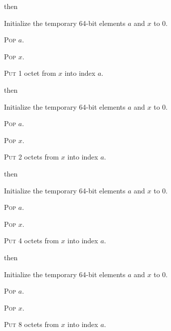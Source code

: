 \documentclass[a4paper,12pt]{article}
\newcommand{\num}[1]{\texttt{#1}}
\newcommand{\hex}[1]{\num{#1}_{\textup{\tiny 16}}}
\newcommand{\proc}[1]{\textsc{#1}}
\newcommand{\op}[1]{$#1$}
\theoremstyle{definition}
\newcommand{\STOREB}    [1]{\op{\hex{14}}}
\newcommand{\STORES}    [1]{\op{\hex{15}}}
\newcommand{\STOREI}    [1]{\op{\hex{16}}}
\newcommand{\STOREL}    [1]{\op{\hex{17}}}
\begin{document}
\begin{stepnumbers}[start=3]
\begin{description}
\begin{stepnumbers}
    \end{stepnumbers}
  \item[\STOREB{}] then
    \begin{stepnumbers}
    \item Initialize the temporary 64-bit elements $a$ and $x$ to 0.
    \item \proc{Pop} $a$.
    \item \proc{Pop} $x$.
    \item \proc{Put} 1 octet from $x$ into index $a$.
    \end{stepnumbers}
  \item[\STORES{}] then
    \begin{stepnumbers}
    \item Initialize the temporary 64-bit elements $a$ and $x$ to 0.
    \item \proc{Pop} $a$.
    \item \proc{Pop} $x$.
    \item \proc{Put} 2 octets from $x$ into index $a$.
    \end{stepnumbers}
  \item[\STOREI{}] then
    \begin{stepnumbers}
    \item Initialize the temporary 64-bit elements $a$ and $x$ to 0.
    \item \proc{Pop} $a$.
    \item \proc{Pop} $x$.
    \item \proc{Put} 4 octets from $x$ into index $a$.
    \end{stepnumbers}
  \item[\STOREL{}] then
    \begin{stepnumbers}
    \item Initialize the temporary 64-bit elements $a$ and $x$ to 0.
    \item \proc{Pop} $a$.
    \item \proc{Pop} $x$.
    \item \proc{Put} 8 octets from $x$ into index $a$.
    \end{stepnumbers}
  \end{description}
\end{stepnumbers}
\end{document}
